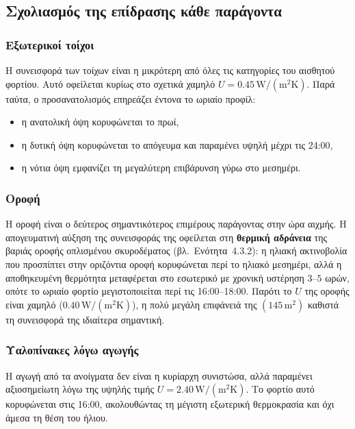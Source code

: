 \documentclass[12pt,a4paper]{article}
\begin{document}
\subsection{Σχολιασμός της επίδρασης κάθε παράγοντα}

\subsubsection{Εξωτερικοί τοίχοι}

Η συνεισφορά των τοίχων είναι η μικρότερη από όλες τις κατηγορίες του αισθητού
φορτίου. Αυτό οφείλεται κυρίως στο σχετικά χαμηλό \(U = 0.45\,\mathrm{W/(m^2K)}\).
Παρά ταύτα, ο προσανατολισμός επηρεάζει έντονα το ωριαίο προφίλ:

\begin{itemize}
\item η ανατολική όψη κορυφώνεται το πρωί,
\item η δυτική όψη κορυφώνεται το απόγευμα και παραμένει υψηλή μέχρι τις 24:00,
\item η νότια όψη εμφανίζει τη μεγαλύτερη επιβάρυνση γύρω στο μεσημέρι.
\end{itemize}

\subsubsection{Οροφή}

Η οροφή είναι ο δεύτερος σημαντικότερος επιμέρους παράγοντας στην ώρα αιχμής. Η
απογευματινή αύξηση της συνεισφοράς της οφείλεται στη \textbf{θερμική αδράνεια}
της βαριάς οροφής οπλισμένου σκυροδέματος (βλ.\ Ενότητα~4.3.2): η ηλιακή
ακτινοβολία που προσπίπτει στην οριζόντια οροφή κορυφώνεται περί το ηλιακό
μεσημέρι, αλλά η αποθηκευμένη θερμότητα μεταφέρεται στο εσωτερικό με
χρονική υστέρηση \(3\)--\(5\) ωρών, οπότε το ωριαίο φορτίο μεγιστοποιείται περί
τις 16:00--18:00. Παρότι το \(U\) της οροφής είναι χαμηλό
(\(0.40\,\mathrm{W/(m^2K)}\)), η πολύ μεγάλη επιφάνειά της
\((145\,\mathrm{m^2})\) καθιστά τη συνεισφορά της ιδιαίτερα σημαντική.

\subsubsection{Υαλοπίνακες λόγω αγωγής}

Η αγωγή από τα ανοίγματα δεν είναι η κυρίαρχη συνιστώσα, αλλά παραμένει αξιοσημείωτη
λόγω της υψηλής τιμής \(U = 2.40\,\mathrm{W/(m^2K)}\). Το φορτίο αυτό κορυφώνεται
στις 16:00, ακολουθώντας τη μέγιστη εξωτερική θερμοκρασία και όχι άμεσα τη θέση του ήλιου.
\end{document}
